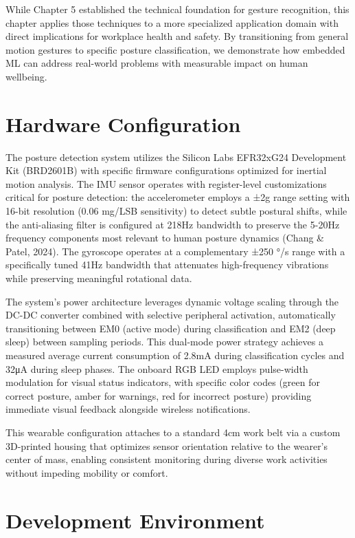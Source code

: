 \documentclass[
  9pt,
  letterpaper,
  abstract,
  titlepage]{scrbook}
\begin{document}
While Chapter 5 established the technical foundation for gesture
recognition, this chapter applies those techniques to a more specialized
application domain with direct implications for workplace health and
safety. By transitioning from general motion gestures to specific
posture classification, we demonstrate how embedded ML can address
real-world problems with measurable impact on human wellbeing.

\section{Hardware Configuration}\label{hardware-configuration}

The posture detection system utilizes the Silicon Labs EFR32xG24
Development Kit (BRD2601B) with specific firmware configurations
optimized for inertial motion analysis. The IMU sensor operates with
register-level customizations critical for posture detection: the
accelerometer employs a ±2g range setting with 16-bit resolution (0.06
mg/LSB sensitivity) to detect subtle postural shifts, while the
anti-aliasing filter is configured at 218Hz bandwidth to preserve the
5-20Hz frequency components most relevant to human posture dynamics
(Chang \& Patel, 2024). The gyroscope operates at a complementary ±250
°/s range with a specifically tuned 41Hz bandwidth that attenuates
high-frequency vibrations while preserving meaningful rotational data.

The system's power architecture leverages dynamic voltage scaling
through the DC-DC converter combined with selective peripheral
activation, automatically transitioning between EM0 (active mode) during
classification and EM2 (deep sleep) between sampling periods. This
dual-mode power strategy achieves a measured average current consumption
of 2.8mA during classification cycles and 32μA during sleep phases. The
onboard RGB LED employs pulse-width modulation for visual status
indicators, with specific color codes (green for correct posture, amber
for warnings, red for incorrect posture) providing immediate visual
feedback alongside wireless notifications.

This wearable configuration attaches to a standard 4cm work belt via a
custom 3D-printed housing that optimizes sensor orientation relative to
the wearer's center of mass, enabling consistent monitoring during
diverse work activities without impeding mobility or comfort.

\section{Development Environment}\label{development-environment}
\end{document}

